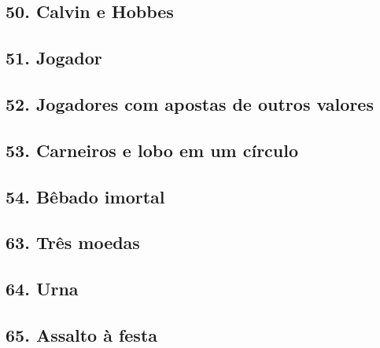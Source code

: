 \documentclass[
  11pt]{report}
\begin{document}
\hypertarget{calvin-e-hobbes}{%
\subsection*{50. Calvin e Hobbes}\label{calvin-e-hobbes}}

\hypertarget{jogador}{%
\subsection*{51. Jogador}\label{jogador}}

\hypertarget{jogadores-com-apostas-de-outros-valores}{%
\subsection*{52. Jogadores com apostas de outros valores}\label{jogadores-com-apostas-de-outros-valores}}

\hypertarget{carneiros-e-lobo-em-um-cuxedrculo}{%
\subsection*{53. Carneiros e lobo em um círculo}\label{carneiros-e-lobo-em-um-cuxedrculo}}

\hypertarget{buxeabado-imortal}{%
\subsection*{54. Bêbado imortal}\label{buxeabado-imortal}}

\hypertarget{truxeas-moedas}{%
\subsection*{63. Três moedas}\label{truxeas-moedas}}

\hypertarget{urna}{%
\subsection*{64. Urna}\label{urna}}

\hypertarget{assalto-uxe0-festa}{%
\subsection*{65. Assalto à festa}\label{assalto-uxe0-festa}}
\end{document}
